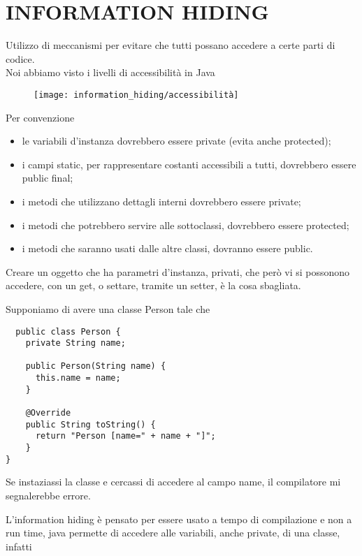 \chapter{INFORMATION HIDING}

Utilizzo di meccanismi per evitare che tutti possano accedere a certe parti di codice.\\
Noi abbiamo visto i livelli di accessibilità in Java

\begin{figure}[H]
  \centering
  \texttt{[image: information\_hiding/accessibilità]}
\end{figure}

Per convenzione

\begin{itemize}
  \item le variabili d'instanza dovrebbero essere private (evita anche protected);
  \item i campi static, per rappresentare costanti accessibili a tutti, dovrebbero essere public final;
  \item i metodi che utilizzano dettagli interni dovrebbero essere private;
  \item i metodi che potrebbero servire alle sottoclassi, dovrebbero essere protected;
  \item i metodi che saranno usati dalle altre classi, dovranno essere public.
\end{itemize}

Creare un oggetto che ha parametri d'instanza, privati, che però vi si possonono accedere, con un get, o settare, tramite un setter, è la cosa sbagliata.

Supponiamo di avere una classe Person tale che

\begin{lstlisting}
  public class Person {
    private String name;
    
    public Person(String name) {
      this.name = name;
    }
    
    @Override
    public String toString() {
      return "Person [name=" + name + "]";
    }
}
\end{lstlisting}

Se instaziassi la classe e cercassi di accedere al campo name, il compilatore mi segnalerebbe errore.

L'information hiding è pensato per essere usato a tempo di compilazione e non a run time, java permette di accedere alle variabili, anche private, di una classe, 
infatti

